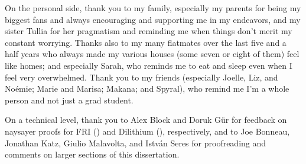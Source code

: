 On the personal side, thank you to my family, especially my parents for being my biggest fans and always encouraging and supporting me in my endeavors, and my sister Tullia for her pragmatism and reminding me when things don't merit my constant worrying. Thanks also to my many flatmates over the last five and a half years who always made my various houses (some seven or eight of them) feel like homes; and especially Sarah, who reminds me to eat and sleep even when I feel very overwhelmed. Thank you to my friends (especially Joelle, Liz, and No\'emie; Marie and Marisa; Makana; and Spyral), who remind me I'm a whole person and not just a grad student. 

On a technical level, thank you to Alex Block and Doruk G\"ur for feedback on naysayer proofs for FRI () and Dilithium (), respectively, and to Joe Bonneau, Jonathan Katz, Giulio Malavolta, and Istv\'an Seres for proofreading and comments on larger sections of this dissertation.